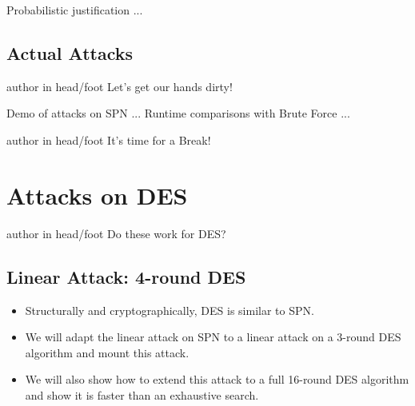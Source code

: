 \documentclass[9pt]{beamer}
\begin{document}
\begin{frame}
Probabilistic justification ...

\end{frame}

\subsection{Actual Attacks}
\begin{frame}
\begin{beamercolorbox}[ht=2.5ex,dp=1.125ex,center,rounded=true,shadow=true]{author in head/foot}
Let's get our hands dirty!
\end{beamercolorbox}
\end{frame}

\begin{frame}
Demo of attacks on SPN ... Runtime comparisons with Brute Force ...

\end{frame}

\begin{frame}
\begin{beamercolorbox}[ht=2.5ex,dp=1.125ex,center,rounded=true,shadow=true]{author in head/foot}
It's time for a Break!
\end{beamercolorbox}
\end{frame}


\section{Attacks on DES}
\begin{frame}
\begin{beamercolorbox}[ht=2.5ex,dp=1.125ex,center,rounded=true,shadow=true]{author in head/foot}
Do these work for DES?
\end{beamercolorbox}
\end{frame}

\subsection{Linear Attack: 4-round DES}
\begin{frame}
\begin{itemize}
\item{Structurally and cryptographically, DES is similar to SPN.}
\item{We will adapt the linear attack on SPN to a linear attack on a 3-round DES algorithm and mount this attack.}
\item{We will also show how to extend this attack to a full 16-round DES algorithm and show it is faster than an exhaustive search.}
\end{itemize}
\end{frame}
\end{document}
